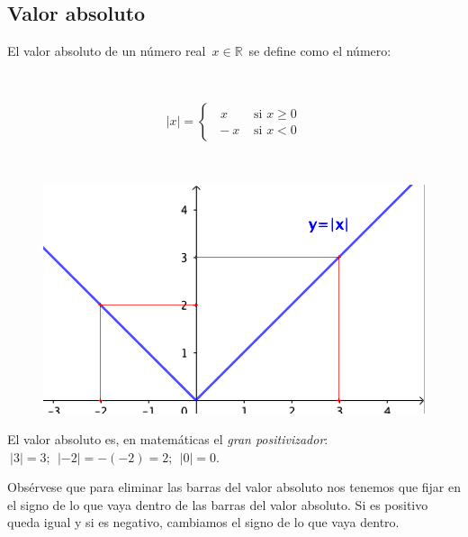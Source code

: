 \vspace{10mm}
\subsection{Valor absoluto}
\vspace{0.5cm}
	
	\begin{definition}[ Valor Absoluto] 
	
	El valor absoluto de un número real $\, x\in \mathbb R\, $ se define como el número:
	\begin{multicols}{2}
	$\quad$
	
	\begin{equation*}
		|x|=
		\begin{cases} 
		\;\;  x &\mbox{ si } x\ge 0 \\ 
		\; -x & \mbox{ si } x<0 
		\end{cases}
	\end{equation*}	
	
	$\quad$
	\begin{figure}[H]
	\centering
	\includegraphics[width=.3\textwidth]{img-reales/reales06.png}	
\end{figure}
	\end{multicols}
	\end{definition}

El valor absoluto es, en matemáticas el \textit{gran positivizador}: $\ |3|=3;\ \ |-2|=-(-2)=2; \ \ |0|=0$.
	
 
 Obsérvese que para eliminar las barras del valor absoluto nos tenemos que fijar en el signo de lo que vaya dentro de las barras del valor absoluto. Si es positivo queda igual y si es negativo, cambiamos el signo de lo que vaya dentro.

